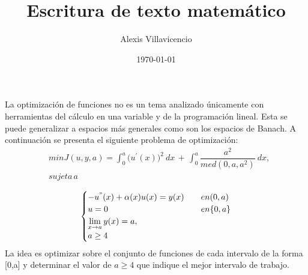 \documentclass[a4paper,12pt]{article}
\author{Alexis Villavicencio}
\title{Escritura de texto matemático}
\date{\today}
\begin{document}
\maketitle
La optimización de funciones no es un tema analizado únicamente con herramientas del cálculo en
una variable y de la programación lineal. Esta se puede generalizar a espacios más generales como
son los espacios de Banach. A continuación se presenta el siguiente problema de optimización:
\begin{align}
  &min J(u,y,a)=\int_{0}^{a} \big(u^{'}(x)\big)^{2}\ dx \,+\,\int_{0}  ^{a} \dfrac{a^2}{med(0,a,a^2)} \ dx , \\
\nonumber&sujeta \,a\nonumber 
\end{align}

\begin{align}
 \begin{cases}
-u^{"}(x)+\alpha(x)u(x)=y(x)\quad &en (0,a)\\
u=0 \quad &en \{0,a\}\\
\displaystyle \lim_{x \to a} y(x)=a,\\
a\geq 4
\end{cases}
\end{align}
La idea es optimizar sobre el conjunto de funciones de cada intervalo de la forma [0,a] y determinar
el valor de 
\(
a\geq4 
\)
que indique el mejor intervalo de trabajo.
\end{document}
